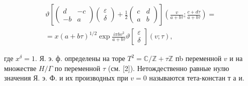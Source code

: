 \documentclass[10pt]{article}
\begin{document}
\[

\begin{gathered}

\vartheta\left[\left(\begin{array}{rr}

d & -c \\

-b & a

\end{array}\right)\left(\begin{array}{l}

\varepsilon \\

\delta

\end{array}\right)+\frac{1}{2}\left(\begin{array}{ll}

c & d \\

a & b

\end{array}\right)\right]\left(\frac{v}{a+b \tau} ; \frac{c+d \tau}{a+b \tau}\right)= \\

=x(a+b \tau)^{1 / 2} \exp \frac{i \pi b v^{2}}{a+b \tau} \vartheta\left[\begin{array}{l}

\varepsilon \\

\delta

\end{array}\right](v ; \tau),

\end{gathered}

\]



где $x^{\delta}=1$. Я. э. ф. определены на торе $T^{2}=\mathbb{C} / \mathbb{Z}+\tau \mathbb{Z}$ пb переменной $v$ и на множестве $H / \Gamma$ по переменной $\tau$ (см. [2]). Нетождественно равные нулю значения Я. э. Ф. и их производных при $v=0$ называются тета-констан т а и.
\end{document}

